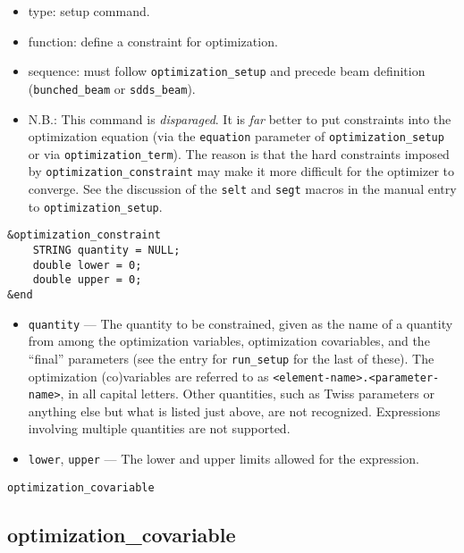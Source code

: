 \documentclass[11pt]{article}
\begin{document}
\begin{itemize}
\item type: setup command.
\item function: define a constraint for optimization.
\item sequence: must follow \verb|optimization_setup| and precede beam definition (\verb|bunched_beam| or \verb|sdds_beam|).
\item N.B.: This command is {\em disparaged}. It is {\em far} better to put constraints
	into the optimization equation (via the \verb|equation| parameter of
	\verb|optimization_setup| or via \verb|optimization_term|).  The reason
	is that the hard constraints imposed by \verb|optimization_constraint|
	may make it more difficult for the optimizer to converge.  See the discussion of the
        \verb|selt| and \verb|segt| macros in the manual entry to \verb|optimization_setup|.
\end{itemize}

\begin{verbatim}
&optimization_constraint
    STRING quantity = NULL;
    double lower = 0;
    double upper = 0;
&end
\end{verbatim}

\begin{itemize}

\item \verb|quantity| --- The quantity to be constrained, given as the
name of a quantity from among the optimization variables, optimization
covariables, and the ``final'' parameters (see the entry for
\verb|run_setup| for the last of these).  The optimization
(co)variables are referred to as
\verb|<element-name>.<parameter-name>|, in all capital letters.  Other
quantities, such as Twiss parameters or anything else but what is
listed just above, are not recognized.  Expressions involving multiple
quantities are not supported.

\item \verb|lower|, \verb|upper| --- The lower and upper limits
allowed for the expression.

\end{itemize}

\newpage
\begin{center}{\Large\verb|optimization_covariable|}\end{center}
\subsection{optimization\_covariable \label{subsec:optimizationcovariable}}
\end{document}
